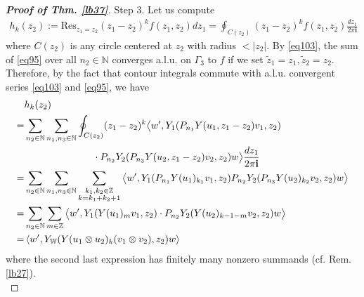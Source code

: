 \documentclass[11pt,b5paper,notitlepage]{article}
\theoremstyle{definition}
\theoremstyle{plain}
\newcommand{\wtd}{\widetilde}
\newcommand{\Res}{\mathrm{Res}}
\newcommand{\im}{\mathbf{i}}
\newcommand{\Wbb}{\mathbb W}
\newcommand{\Nbb}{\mathbb N}
\newcommand{\Zbb}{\mathbb Z}
\newcommand{\<}{\left\langle}
\renewcommand{\>}{\right\rangle}
\numberwithin{equation}{subsection}
\begin{document}
\begin{proof}[\textbf{Proof of Thm. \ref{lb37}}]
Step 3. Let us compute 
\begin{align*}
h_k(z_2):=\Res_{z_1=z_2}(z_1-z_2)^k f(z_1,z_2)dz_1=\oint_{C(z_2)} (z_1-z_2)^k f(z_1,z_2)\frac{dz_1}{2\pi\im}
\end{align*}
where $C(z_2)$ is any circle centered at $z_2$ with radius $<|z_2|$. By \eqref{eq103}, the sum of \eqref{eq95} over all $n_2\in\Nbb$ converges a.l.u. on $\Gamma_3$ to $f$ if we set $\wtd z_1=z_1,\wtd z_2=z_2$. Therefore, by the fact that contour integrals commute with a.l.u. convergent series \eqref{eq103} and \eqref{eq95}, we have
\begin{align}
&h_k(z_2)\nonumber\\
=&\sum_{n_2\in\Nbb}\sum_{n_1,n_3\in\Nbb}\oint_{C(z_2)} (z_1-z_2)^k\big\langle w',Y_1(P_{n_1}Y(u_1,z_1-z_2)v_1,z_2)\nonumber\\
&\qquad\qquad\qquad\quad\cdot P_{n_2}Y_2(P_{n_3}Y(u_2,z_1-z_2)v_2, z_2)w\big\rangle \frac{dz_1}{2\pi\im}\nonumber\\
=&\sum_{n_2\in\Nbb}\sum_{n_1,n_3\in\Nbb}\sum_{
\begin{subarray}{c}
k_1,k_2\in\Zbb\\
k=k_1+k_2+1
\end{subarray}
}\big\langle w',Y_1(P_{n_1}Y(u_1)_{k_1}v_1,z_2) P_{n_2}Y_2(P_{n_3}Y(u_2)_{k_2}v_2, z_2)w\big\rangle \nonumber\\
=&\sum_{n_2\in\Nbb}\sum_{m\in\Zbb} \big\langle w',Y_1(Y(u_1)_mv_1,z_2)\cdot P_{n_2}Y_2(Y(u_2)_{k-1-m}v_2,z_2)w\big\rangle \nonumber\\
=&\<w',Y_\Wbb(Y(u_1\otimes u_2)_k(v_1\otimes v_2),z_2)w\>  \label{eq106}
\end{align}
where the second last expression has finitely many nonzero summands (cf. Rem. \ref{lb27}).\\[-1ex]


\end{proof}
\end{document}
